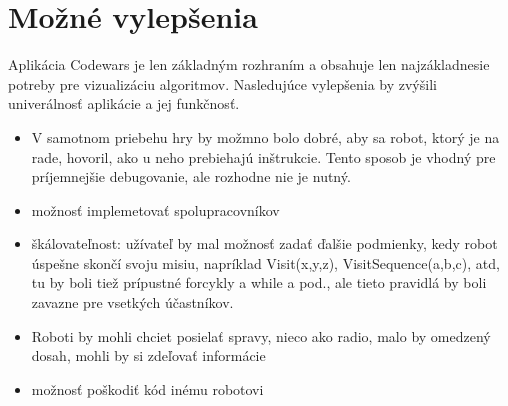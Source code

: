 \section{Možné vylepšenia}
Aplikácia Codewars je len základným rozhraním a obsahuje len najzákladnesie potreby pre vizualizáciu algoritmov. Nasledujúce vylepšenia by zvýšili univerálnosť aplikácie a jej funkčnosť.\\
\begin{itemize}
\item V samotnom priebehu hry by možmno bolo dobré, aby sa robot, ktorý je na rade, hovoril, ako u neho prebiehajú inštrukcie. Tento sposob je vhodný pre príjemnejšie debugovanie, ale rozhodne nie je nutný.
\item možnosť implemetovať spolupracovníkov
\item škálovateľnost: užívateľ by mal možnosť zadať ďalšie podmienky, kedy robot úspešne skončí svoju misiu, napríklad Visit(x,y,z), VisitSequence(a,b,c), atd, tu by boli tiež prípustné forcykly  a while a pod., ale tieto pravidlá by boli zavazne pre vsetkých účastníkov.
\item Roboti by mohli chciet posielať spravy, nieco ako radio, malo by omedzený dosah, mohli by si zdeľovať informácie 
\item možnosť poškodiť kód inému robotovi
\end{itemize}
%


%
